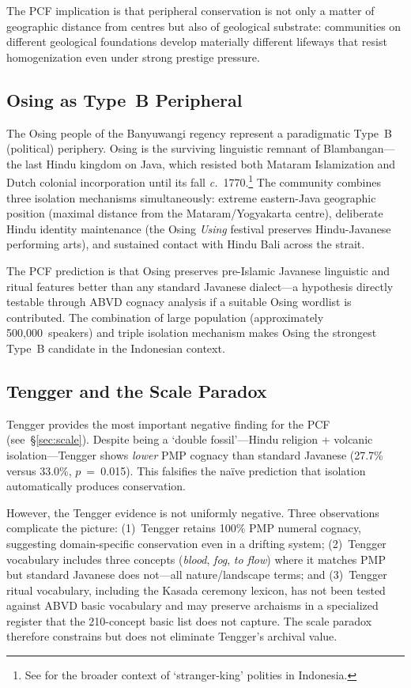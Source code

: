 \documentclass[12pt,a4paper]{article}
\begin{document}
The PCF implication is that peripheral conservation is not only a matter of geographic distance from centres but also of geological substrate: communities on different geological foundations develop materially different lifeways that resist homogenization even under strong prestige pressure.

\subsection{Osing as Type~B Peripheral}

The Osing people of the Banyuwangi regency represent a paradigmatic Type~B (political) periphery. Osing is the surviving linguistic remnant of Blambangan---the last Hindu kingdom on Java, which resisted both Mataram Islamization and Dutch colonial incorporation until its fall \textit{c.}~1770.\footnote{See \autocite{henley2004trousers} for the broader context of `stranger-king' polities in Indonesia.} The community combines three isolation mechanisms simultaneously: extreme eastern-Java geographic position (maximal distance from the Mataram/Yogyakarta centre), deliberate Hindu identity maintenance (the Osing \emph{Using} festival preserves Hindu-Javanese performing arts), and sustained contact with Hindu Bali across the strait.

The PCF prediction is that Osing preserves pre-Islamic Javanese linguistic and ritual features better than any standard Javanese dialect---a hypothesis directly testable through ABVD cognacy analysis if a suitable Osing wordlist is contributed. The combination of large population (approximately 500,000~speakers) and triple isolation mechanism makes Osing the strongest Type~B candidate in the Indonesian context.

\subsection{Tengger and the Scale Paradox}

Tengger provides the most important negative finding for the PCF (see~\S\ref{sec:scale}). Despite being a `double fossil'---Hindu religion + volcanic isolation---Tengger shows \emph{lower} PMP cognacy than standard Javanese (27.7\% versus 33.0\%, $p$~=~0.015). This falsifies the na\"ive prediction that isolation automatically produces conservation.

However, the Tengger evidence is not uniformly negative. Three observations complicate the picture: (1)~Tengger retains 100\% PMP numeral cognacy, suggesting domain-specific conservation even in a drifting system; (2)~Tengger vocabulary includes three concepts (\emph{blood}, \emph{fog}, \emph{to flow}) where it matches PMP but standard Javanese does not---all nature/landscape terms; and (3)~Tengger ritual vocabulary, including the Kasada ceremony lexicon, has not been tested against ABVD basic vocabulary and may preserve archaisms in a specialized register that the 210-concept basic list does not capture. The scale paradox therefore constrains but does not eliminate Tengger's archival value.
\end{document}
